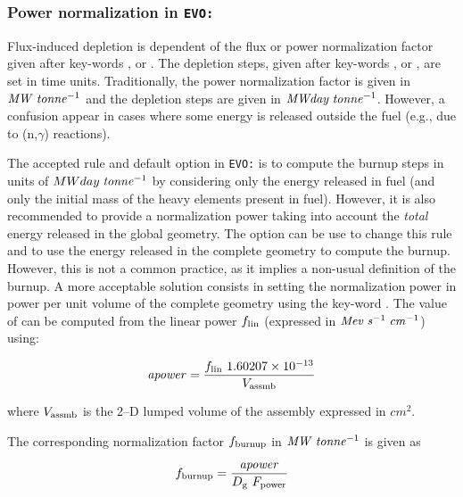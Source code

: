 \subsubsection{Power normalization in {\tt EVO:}}\label{sect:powerevo}

Flux-induced depletion is dependent of the flux or power normalization factor
given after key-words ,  or . The depletion
steps, given after key-words ,  or , are set
in time units. Traditionally, the power normalization factor is given in
${\it MW}\;{\it tonne}^{-1}$ and the depletion steps are given in
${\it MWday}\;{\it tonne}^{-1}$. However, a confusion appear in cases where
some energy is released outside the fuel (e.g., due to (n,$\gamma$) reactions).

\vskip 0.2cm

The accepted rule and default option in {\tt EVO:} is to compute the burnup
steps in units of $MWday\;{\it tonne}^{-1}$ by considering only the energy
released in fuel (and only the initial mass of the heavy elements present
in fuel). However, it is also recommended to provide a normalization power
taking into account the {\sl total} energy released in the global geometry.
The  option can be use to change this rule and to use
the energy released in the complete geometry to compute the burnup. However,
this is not a
common practice, as it implies a non-usual definition of the burnup.
A more acceptable solution consists in setting the normalization power
in power per unit volume of the complete geometry using the key-word
. The value of  can be computed from the linear
power $f_{\rm lin}$ (expressed in ${\it Mev}\;{\it s}^{-1}\;{\it cm}^{-1}$)
using:

\begin{equation}
{\it apower}={f_{\rm lin} \ 1.60207 \times 10^{-13} \over V_{\rm assmb}}
\label{eq:eq1}
\end{equation}

\noindent where $V_{\rm assmb}$ is the 2--D lumped volume of the assembly expressed in $cm^2$.

\vskip 0.2cm

The corresponding normalization factor $f_{\rm burnup}$ in
${\it MW}\;{\it tonne}^{-1}$ is given as

\begin{equation}
f_{\rm burnup}={ {\it apower} \over D_{\rm g} \ F_{\rm power}}
\label{eq:eq2}
\end{equation}

